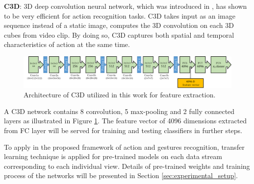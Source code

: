     \textbf{C3D}: 3D deep convolution neural network, which was introduced in \cite{tran2015learning}, has shown to be very efficient for action recognition tasks. C3D takes input as an image sequence instead of a static image, computes the 3D convolution on each 3D cubes from video clip. By doing so, C3D captures both spatial and temporal characteristics of action at the same time.
    \begin{figure}[htbp]
        \centering
        \includegraphics[width=1\linewidth]{figs/C3D.png}
        \caption{Architecture of C3D utilized in this work for feature extraction.}
        \label{fig:C3D}
    \end{figure}
    A C3D network contains 8 convolution, 5 max-pooling and 2 fully connected layers as illustrated in Figure \ref{fig:C3D}. 
    The feature vector of 4096 dimensions extracted from FC layer will be served for training and testing classifiers in further steps.

    To apply in the proposed framework of action and gestures recognition, transfer learning technique is applied for pre-trained models on each data stream corresponding to each individual view.
    Details of pre-trained weights and training process of the networks will be presented in Section \ref{sec:experimental_setup}.

